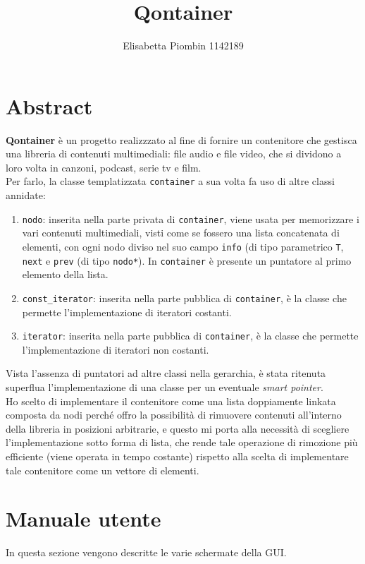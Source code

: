 \documentclass[a4paper,10pt]{article}
\begin{document}
\title {Qontainer}
\author {Elisabetta Piombin 1142189}
\date{}

\maketitle
\tableofcontents
\clearpage\mbox{}

\section{Abstract}
\textbf{Qontainer} è un progetto realizzzato al fine di fornire un contenitore che gestisca una libreria di contenuti multimediali: file audio e file video, che si dividono a loro volta in canzoni, podcast, serie tv e film. \\
Per farlo, la classe templatizzata \texttt{container} a sua volta fa uso di altre classi annidate:
\begin{enumerate}
\item \texttt{nodo}: inserita nella parte privata di \texttt{container}, viene usata per memorizzare i vari contenuti multimediali, visti come se fossero una lista concatenata di elementi, con ogni nodo diviso nel suo campo \texttt{info} (di tipo parametrico \texttt{T}, \texttt{next} e \texttt{prev} (di tipo \texttt{nodo*}). In \texttt{container} è presente un puntatore al primo elemento della lista.
\item \texttt{const\_iterator}: inserita nella parte pubblica di \texttt{container}, è la classe che permette l'implementazione di iteratori costanti.
\item \texttt{iterator}: inserita nella parte pubblica di \texttt{container}, è la classe che permette l'implementazione di iteratori non costanti.
\end{enumerate}
Vista l'assenza di puntatori ad altre classi nella gerarchia, è stata ritenuta superflua l'implementazione di una classe per un eventuale \textit{smart pointer}.\\
Ho scelto di implementare il contenitore come una lista doppiamente linkata composta da nodi perché offro la possibilità di rimuovere contenuti all'interno della libreria in posizioni arbitrarie, e questo mi porta alla necessità di scegliere l'implementazione sotto forma di lista, che rende tale operazione di rimozione più efficiente (viene operata in tempo costante) rispetto alla scelta di implementare tale contenitore come un vettore di elementi.
\section{Manuale utente}
In questa sezione vengono descritte le varie schermate della GUI.\\
\end{document}
